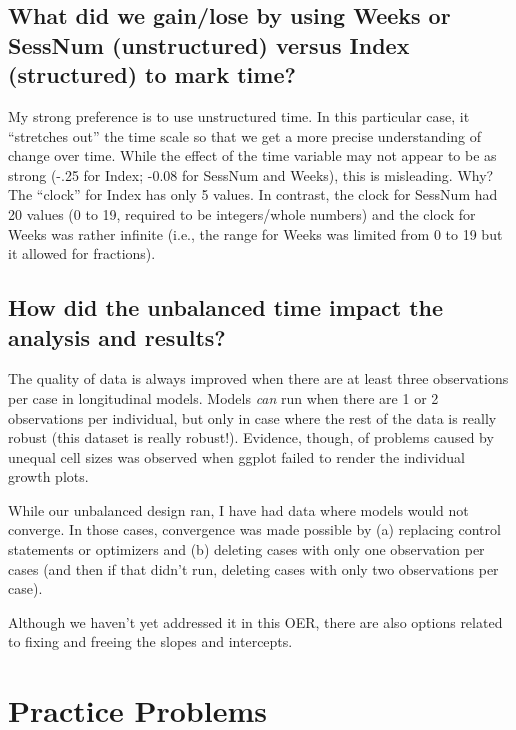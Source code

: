 \documentclass[
  11pt,
]{book}
\begin{document}
\hypertarget{what-did-we-gainlose-by-using-weeks-or-sessnum-unstructured-versus-index-structured-to-mark-time}{%
\subsection{What did we gain/lose by using Weeks or SessNum (unstructured) versus Index (structured) to mark time?}\label{what-did-we-gainlose-by-using-weeks-or-sessnum-unstructured-versus-index-structured-to-mark-time}}

My strong preference is to use unstructured time. In this particular case, it ``stretches out'' the time scale so that we get a more precise understanding of change over time. While the effect of the time variable may not appear to be as strong (-.25 for Index; -0.08 for SessNum and Weeks), this is misleading. Why? The ``clock'' for Index has only 5 values. In contrast, the clock for SessNum had 20 values (0 to 19, required to be integers/whole numbers) and the clock for Weeks was rather infinite (i.e., the range for Weeks was limited from 0 to 19 but it allowed for fractions).

\hypertarget{how-did-the-unbalanced-time-impact-the-analysis-and-results}{%
\subsection{How did the unbalanced time impact the analysis and results?}\label{how-did-the-unbalanced-time-impact-the-analysis-and-results}}

The quality of data is always improved when there are at least three observations per case in longitudinal models. Models \emph{can} run when there are 1 or 2 observations per individual, but only in case where the rest of the data is really robust (this dataset is really robust!). Evidence, though, of problems caused by unequal cell sizes was observed when ggplot failed to render the individual growth plots.

While our unbalanced design ran, I have had data where models would not converge. In those cases, convergence was made possible by (a) replacing control statements or optimizers and (b) deleting cases with only one observation per cases (and then if that didn't run, deleting cases with only two observations per case).

Although we haven't yet addressed it in this OER, there are also options related to fixing and freeing the slopes and intercepts.

\hypertarget{practice-problems-3}{%
\section{Practice Problems}\label{practice-problems-3}}
\end{document}
